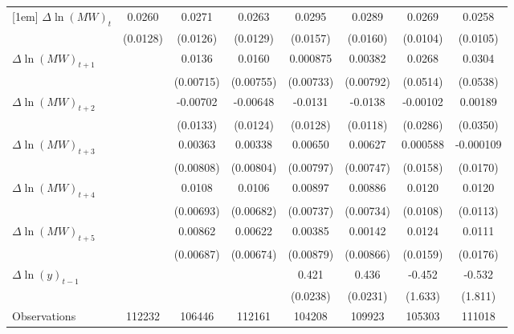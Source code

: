 {\begin{tabular}{l*{7}{c}}
[1em]
$\Delta \ln(MW)_{t}$&   0.0260\sym{**} &   0.0271\sym{**} &   0.0263\sym{**} &   0.0295\sym{*}  &   0.0289\sym{*}  &   0.0269\sym{**} &   0.0258\sym{**} \\
          & (0.0128)         & (0.0126)         & (0.0129)         & (0.0157)         & (0.0160)         & (0.0104)         & (0.0105)         \\
[1em]
$\Delta \ln(MW)_{t+1}$&                  &   0.0136\sym{*}  &   0.0160\sym{**} & 0.000875         &  0.00382         &   0.0268         &   0.0304         \\
          &                  &(0.00715)         &(0.00755)         &(0.00733)         &(0.00792)         & (0.0514)         & (0.0538)         \\
[1em]
$\Delta \ln(MW)_{t+2}$&                  & -0.00702         & -0.00648         &  -0.0131         &  -0.0138         & -0.00102         &  0.00189         \\
          &                  & (0.0133)         & (0.0124)         & (0.0128)         & (0.0118)         & (0.0286)         & (0.0350)         \\
[1em]
$\Delta \ln(MW)_{t+3}$&                  &  0.00363         &  0.00338         &  0.00650         &  0.00627         & 0.000588         &-0.000109         \\
          &                  &(0.00808)         &(0.00804)         &(0.00797)         &(0.00747)         & (0.0158)         & (0.0170)         \\
[1em]
$\Delta \ln(MW)_{t+4}$&                  &   0.0108         &   0.0106         &  0.00897         &  0.00886         &   0.0120         &   0.0120         \\
          &                  &(0.00693)         &(0.00682)         &(0.00737)         &(0.00734)         & (0.0108)         & (0.0113)         \\
[1em]
$\Delta \ln(MW)_{t+5}$&                  &  0.00862         &  0.00622         &  0.00385         &  0.00142         &   0.0124         &   0.0111         \\
          &                  &(0.00687)         &(0.00674)         &(0.00879)         &(0.00866)         & (0.0159)         & (0.0176)         \\
[1em]
$\Delta \ln(y)_{t-1}$&                  &                  &                  &    0.421\sym{***}&    0.436\sym{***}&   -0.452         &   -0.532         \\
          &                  &                  &                  & (0.0238)         & (0.0231)         &  (1.633)         &  (1.811)         \\
\hline
Observations&   112232         &   106446         &   112161         &   104208         &   109923         &   105303         &   111018         \\
\hline\hline
\end{tabular}
}
